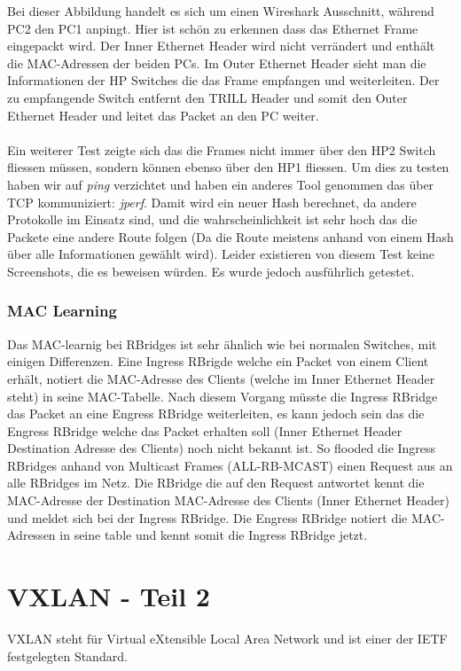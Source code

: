\documentclass[a4,12pt]{scrartcl}
\begin{document}
\noindent Bei dieser Abbildung handelt es sich um einen Wireshark Ausschnitt, während PC2 den PC1 anpingt. Hier ist schön zu erkennen dass das Ethernet Frame eingepackt wird. Der Inner Ethernet Header wird nicht verrändert und enthält die MAC-Adressen der beiden PCs. Im Outer Ethernet Header sieht man die Informationen der HP Switches die das Frame empfangen und weiterleiten. Der zu empfangende Switch entfernt den TRILL Header und somit den Outer Ethernet Header und leitet das Packet an den PC weiter. \\\\
Ein weiterer Test zeigte sich das die Frames nicht immer über den HP2 Switch fliessen müssen, sondern können ebenso über den HP1 fliessen.  Um dies zu testen haben wir auf \textit{ping} verzichtet und haben ein anderes Tool genommen das über TCP kommuniziert: \textit{jperf}. Damit wird ein neuer Hash  berechnet, da andere Protokolle im Einsatz sind, und die wahrscheinlichkeit ist sehr hoch das die Packete eine andere Route folgen (Da die Route meistens anhand von einem Hash über alle Informationen gewählt wird). Leider existieren von diesem Test keine Screenshots, die es beweisen würden. Es wurde jedoch ausführlich getestet.  

\subsubsection{MAC Learning} 
Das MAC-learnig bei RBridges ist sehr ähnlich wie bei normalen Switches, mit einigen Differenzen. Eine Ingress RBrigde welche ein Packet von einem Client erhält, notiert die MAC-Adresse des Clients (welche im Inner Ethernet Header steht) in seine MAC-Tabelle. Nach diesem Vorgang müsste die Ingress RBridge das Packet an eine Engress RBridge weiterleiten, es kann jedoch sein das die Engress RBridge welche das Packet erhalten soll (Inner Ethernet Header Destination Adresse des Clients) noch nicht bekannt ist. So flooded die Ingress RBridges anhand von Multicast Frames (ALL-RB-MCAST) einen Request aus an alle RBridges im Netz. Die RBridge die auf den Request antwortet kennt die MAC-Adresse der Destination MAC-Adresse des Clients (Inner Ethernet Header) und meldet sich bei der Ingress RBridge. Die Engress RBridge notiert die MAC-Adressen in seine table und kennt somit die Ingress RBridge jetzt. 

\newpage
\section{VXLAN - Teil 2}
VXLAN steht für Virtual eXtensible Local Area Network und ist einer der IETF festgelegten Standard. 
\end{document}
